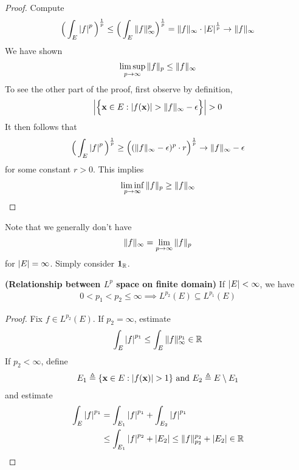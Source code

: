 \documentclass{report}
\begin{document}
\begin{proof}
Compute 
\begin{align*}
\Big(\int_E \left|f\right|^p \Big)^{\frac{1}{p}}\leq \Big(\int_E \| f \|_{\infty}^p \Big)^{\frac{1}{p}}= \| f \|_{\infty} \cdot \left|E\right|^{\frac{1}{p}} \to \| f \|_{\infty}
\end{align*}
We have shown 
\begin{align*}
\limsup_{p\to\infty} \| f \|_p \leq \| f \|_\infty
\end{align*}
To see the other part of the proof, first observe by definition,  
\begin{align*}
\abso{\bset{\textbf{x} \in E: \abso{f(\textbf{x})}> \norm{f}_\infty -\epsilon }}> 0
\end{align*}
It then follows that 
\begin{align*}
\Big(\int_E \left|f\right|^{p} \Big)^{\frac{1}{p}}\geq \Big( (\| f \|_\infty -\epsilon)^p \cdot r  \Big)^{\frac{1}{p}} \to \| f \|_{\infty} - \epsilon 
\end{align*}
for some constant $r>0$. This implies 
\begin{align*}
\liminf_{p\to\infty} \| f \|_p \geq \| f \|_\infty
\end{align*}
\end{proof}
\begin{mdframed}
Note that we generally don't have 
\begin{align*}
\| f \|_\infty = \lim_{p\to \infty} \| f \|_p
\end{align*}
for $\left|E\right|=\infty$. Simply consider $\textbf{1}_{\mathbb{R}}$. 
\end{mdframed}
\begin{theorem}
\label{RbLp}
\textbf{(Relationship between $L^p$ space on finite domain)} If $\left|E\right|< \infty$, we have 
\begin{align*}
0< p_1<p_2\leq \infty \implies   L^{p_2}(E)\subseteq L^{p_1}(E)
\end{align*}
\end{theorem}
\begin{proof}
Fix $f\in L^{p_2}(E)$. If $p_2=\infty$, estimate 
\begin{align*}
\int_E \left|f\right|^{p_1}\leq \int_E \| f \|_{\infty}^{p_1}\in\mathbb{R}
\end{align*}
If $p_2<\infty$, define 
\begin{align*}
  E_1 \triangleq \set{\textbf{x}\in E: \abso{f(\textbf{x})}>1}\text{ and }E_2\triangleq E \setminus E_1
\end{align*}
and estimate 
\begin{align*}
  \int_E \left|f\right|^{p_1}&= \int_{E_1} \left|f\right|^{p_1} + \int_{E_2} \left|f\right|^{p_1} \\
 &\leq \int_{E_1} \left|f\right|^{p_2} + \left|E_2\right|\leq \| f \|_{p_2}^{p_2} + \left|E_2\right|\in\mathbb{R}
\end{align*}
\end{proof}
\end{document}
